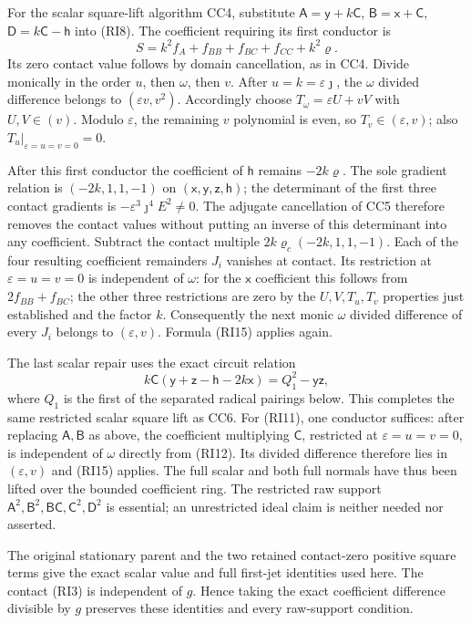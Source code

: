 For the scalar square-lift algorithm CC4, substitute
$\mathsf A=\mathsf y+k\mathsf C$,
$\mathsf B=\mathsf x+\mathsf C$,
$\mathsf D=k\mathsf C-\mathsf h$ into (RI8).
The coefficient requiring its first conductor is
\[
 S=k^2f_A+f_{BB}+f_{BC}+f_{CC}+k^2\varrho.
\]
Its zero contact value follows by domain cancellation, as in CC4.
Divide monically in the order $u$, then $\omega$, then $v$.
After $u=k=\varepsilon\jmath$, the $\omega$ divided difference
belongs to $(\varepsilon v,v^2)$. Accordingly choose
$T_\omega=\varepsilon U+vV$ with $U,V\in(v)$.
Modulo $\varepsilon$, the remaining $v$ polynomial is even, so
$T_v\in(\varepsilon,v)$; also
$T_u|_{\varepsilon=u=v=0}=0$.

After this first conductor the coefficient of $\mathsf h$ remains
$-2k\varrho$. The sole gradient relation is
$(-2k,1,1,-1)$ on
$(\mathsf x,\mathsf y,\mathsf z,\mathsf h)$; the determinant of
the first three contact gradients is
$-\varepsilon^3\jmath^4E^2\ne0$. The adjugate cancellation of
CC5 therefore removes the contact values without putting an inverse
of this determinant into any coefficient. Subtract the contact
multiple $2k\varrho_c(-2k,1,1,-1)$.
Each of the four resulting coefficient remainders $J_i$ vanishes at
contact. Its restriction at $\varepsilon=u=v=0$ is independent of
$\omega$: for the $\mathsf x$ coefficient this follows from
$2f_{BB}+f_{BC}$; the other three restrictions are zero by the
$U,V,T_u,T_v$ properties just established and the factor $k$.
Consequently the next monic $\omega$ divided difference of every
$J_i$ belongs to $(\varepsilon,v)$. Formula (RI15) applies again.

The last scalar repair uses the exact circuit relation
\[
 k\mathsf C(\mathsf y+\mathsf z-\mathsf h-2k\mathsf x)
       =Q_1^2-\mathsf y\mathsf z,
\]
where $Q_1$ is the first of the separated radical pairings below.
This completes the same restricted scalar square lift as CC6.
For (RI11), one conductor suffices: after replacing
$\mathsf A,\mathsf B$ as above, the coefficient multiplying
$\mathsf C$, restricted at $\varepsilon=u=v=0$, is independent of
$\omega$ directly from (RI12). Its divided difference therefore
lies in $(\varepsilon,v)$ and (RI15) applies. The full scalar and
both full normals have thus been lifted over the bounded coefficient
ring. The restricted raw support $\mathsf A^2,\mathsf B^2,
\mathsf B\mathsf C,\mathsf C^2,\mathsf D^2$ is essential;
an unrestricted ideal claim is neither needed nor asserted.

The original stationary parent and the two retained contact-zero
positive square terms give the exact scalar value and full first-jet identities
used here. The contact (RI3) is independent of $g$. Hence taking
the exact coefficient difference divisible by $g$ preserves these
identities and every raw-support condition.

